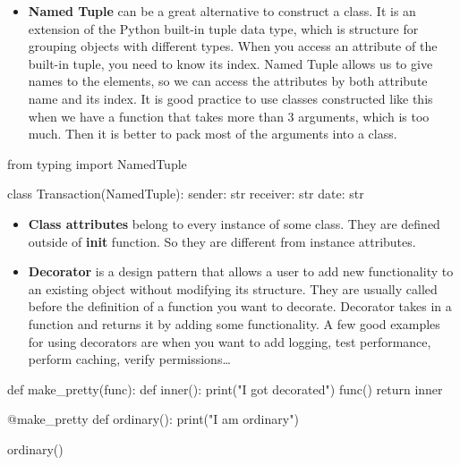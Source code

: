 \documentclass[
  letterpaper,
  DIV=11,
  numbers=noendperiod]{scrreprt}
\newenvironment{Shaded}{\begin{snugshade}}{\end{snugshade}}
\newcommand{\AttributeTok}[1]{\textcolor[rgb]{0.40,0.45,0.13}{#1}}
\newcommand{\BuiltInTok}[1]{\textcolor[rgb]{0.00,0.23,0.31}{#1}}
\newcommand{\ControlFlowTok}[1]{\textcolor[rgb]{0.00,0.23,0.31}{#1}}
\newcommand{\ImportTok}[1]{\textcolor[rgb]{0.00,0.46,0.62}{#1}}
\newcommand{\KeywordTok}[1]{\textcolor[rgb]{0.00,0.23,0.31}{#1}}
\newcommand{\NormalTok}[1]{\textcolor[rgb]{0.00,0.23,0.31}{#1}}
\newcommand{\StringTok}[1]{\textcolor[rgb]{0.13,0.47,0.30}{#1}}
\providecommand{\tightlist}{%
  \setlength{\itemsep}{0pt}\setlength{\parskip}{0pt}}\usepackage{longtable,booktabs,array}
\begin{document}
\begin{itemize}
\tightlist
\item
  \textbf{Named Tuple} can be a great alternative to construct a class.
  It is an extension of the Python built-in tuple data type, which is
  structure for grouping objects with different types. When you access
  an attribute of the built-in tuple, you need to know its index. Named
  Tuple allows us to give names to the elements, so we can access the
  attributes by both attribute name and its index. It is good practice
  to use classes constructed like this when we have a function that
  takes more than 3 arguments, which is too much. Then it is better to
  pack most of the arguments into a class.
\end{itemize}

\begin{Shaded}
\begin{Highlighting}[]
\ImportTok{from}\NormalTok{ typing }\ImportTok{import}\NormalTok{ NamedTuple}

\KeywordTok{class}\NormalTok{ Transaction(NamedTuple):}
\NormalTok{    sender: }\BuiltInTok{str}
\NormalTok{    receiver: }\BuiltInTok{str}
\NormalTok{    date: }\BuiltInTok{str}
\end{Highlighting}
\end{Shaded}

\begin{itemize}
\tightlist
\item
  \textbf{Class attributes} belong to every instance of some class. They
  are defined outside of \textbf{init} function. So they are different
  from instance attributes.
\item
  \textbf{Decorator} is a design pattern that allows a user to add new
  functionality to an existing object without modifying its structure.
  They are usually called before the definition of a function you want
  to decorate. Decorator takes in a function and returns it by adding
  some functionality. A few good examples for using decorators are when
  you want to add logging, test performance, perform caching, verify
  permissions\ldots{}
\end{itemize}

\begin{Shaded}
\begin{Highlighting}[]
\KeywordTok{def}\NormalTok{ make\_pretty(func):}
    \KeywordTok{def}\NormalTok{ inner():}
        \BuiltInTok{print}\NormalTok{(}\StringTok{"I got decorated"}\NormalTok{)}
\NormalTok{        func()}
\ControlFlowTok{return}\NormalTok{ inner}

\AttributeTok{@make\_pretty}
\KeywordTok{def}\NormalTok{ ordinary():}
    \BuiltInTok{print}\NormalTok{(}\StringTok{"I am ordinary"}\NormalTok{)}

\NormalTok{ordinary() }
\end{Highlighting}
\end{Shaded}
\end{document}
